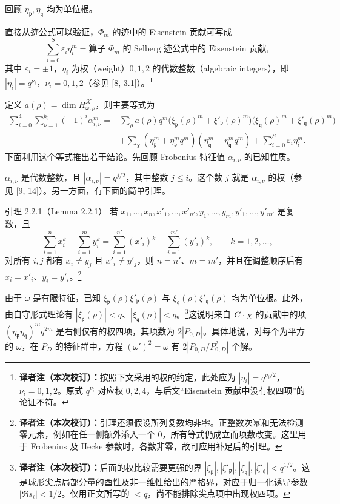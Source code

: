 回顾 $\eta_{\mathfrak p},\eta_{\mathfrak q}$ 均为单位根。

直接从迹公式可以验证，$\Phi_m$ 的迹中的 Eisenstein 贡献可写成
\[
\sum_{i=0}^S\varepsilon_i\eta_i^m
=\text{算子 }\Phi_m\text{ 的 Selberg 迹公式中的 Eisenstein 贡献},
\]
其中 $\varepsilon_i=\pm1$，$\eta_i$ 为权（weight）$0,1,2$ 的代数整数（algebraic integers），即
$|\eta_i|=q^{\nu_i}$，$\nu_i=0,1,2$（参见 [8, 3.1]）。\footnote{\textbf{译者注（本次校订）：}按照下文采用的权的约定，此处应为 $|\eta_i|=q^{\nu_i/2}$，$\nu_i=0,1,2$。原式 $q^{\nu_i}$ 对应权 $0,2,4$，与后文“Eisenstein 贡献中没有权四项”的论证不符。}

定义 $a(\rho)=\dim H_{\omega,\rho}^{\mathcal K}$，则主要等式为
\begin{align*}
\sum_{i=0}^4\sum_{\nu=1}^{b_i}(-1)^i\alpha_{i,\nu}^m
={}&\sum_\rho a(\rho)q^m
\bigl(\xi_{\mathfrak p}(\rho)^m+\xi'_{\mathfrak p}(\rho)^m\bigr)
\bigl(\xi_{\mathfrak q}(\rho)^m+\xi'_{\mathfrak q}(\rho)^m\bigr)\\
&+\sum_\chi(\eta_{\mathfrak p}^m+\eta_{\mathfrak p}^mq^m)
(\eta_{\mathfrak q}^m+\eta_{\mathfrak q}^mq^m)
+\sum_{i=0}^S\varepsilon_i\eta_i^m.
\end{align*}
下面利用这个等式推出若干结论。先回顾 Frobenius 特征值 $\alpha_{i,\nu}$ 的已知性质。

$\alpha_{i,\nu}$ 是代数整数，且 $|\alpha_{i,\nu}|=q^{j/2}$，其中整数 $j\leq i$。这个数 $j$ 就是 $\alpha_{i,\nu}$ 的权（参见 [9, 14]）。另一方面，有下面的简单引理。
\begin{originaltheorem}{引理 2.2.1（Lemma 2.2.1）}
若 $x_1,\ldots,x_n,x'_1,\ldots,x'_{n'},y_1,\ldots,y_m,y'_1,\ldots,y'_{m'}$ 是复数，且
\[
\sum_{i=1}^nx_i^k-\sum_{i=1}^my_i^k
=\sum_{i=1}^{n'}(x'_i)^k-\sum_{i=1}^{m'}(y'_i)^k,
\qquad k=1,2,\ldots,
\]
对所有 $i,j$ 都有 $x_i\ne y_j$ 且 $x'_i\ne y'_j$，则 $n=n'$、$m=m'$，并且在调整顺序后有
$x_i=x'_i$、$y_i=y'_i$。\footnote{\textbf{译者注（本次校订）：}引理还须假设所列复数均非零。正整数次幂和无法检测零元素，例如在任一侧额外添入一个 $0$，所有等式仍成立而项数改变。这里用于 Frobenius 及 Hecke 参数时，各数非零，故可应用补足后的引理。}
\end{originaltheorem}
由于 $\omega$ 是有限特征，已知 $\xi_{\mathfrak p}(\rho)\xi'_{\mathfrak p}(\rho)$ 与
$\xi_{\mathfrak q}(\rho)\xi'_{\mathfrak q}(\rho)$ 均为单位根。此外，由自守形式理论有
$|\xi_{\mathfrak p}(\rho)|<q$、$|\xi_{\mathfrak q}(\rho)|<q$。\footnote{\textbf{译者注（本次校订）：}后面的权比较需要更强的界 $|\xi_{\mathfrak p}|,|\xi'_{\mathfrak p}|,|\xi_{\mathfrak q}|,|\xi'_{\mathfrak q}|<q^{1/2}$。这是球形尖点局部分量的酉性及非一维性给出的严格界，对应于归一化诱导参数 $|\Re s_i|<1/2$。仅用正文所写的 $<q$，尚不能排除尖点项中出现权四项。}这说明来自 $C\cdot\chi$ 的贡献中的项
$(\eta_{\mathfrak p}\eta_{\mathfrak q})^mq^{2m}$ 是右侧仅有的权四项，其项数为 $2|P_{0,D}|$。具体地说，对每个为平方的 $\omega$，在 $P_D$ 的特征群中，方程 $(\omega')^2=\omega$ 有
$2|P_{0,D}/P_{0,D}^2|$ 个解。

